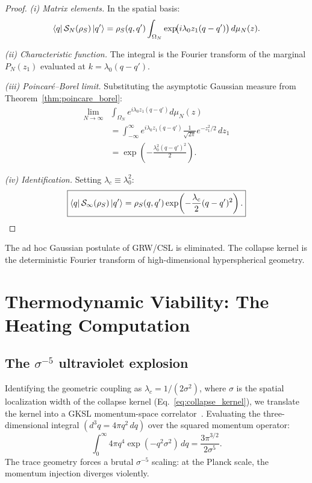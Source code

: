 \documentclass[aps,prd,twocolumn,superscriptaddress,nofootinbib]{revtex4-2}
\theoremstyle{definition}
\theoremstyle{remark}
\newcommand{\SN}{\mathcal{S}_N}
\begin{document}
\begin{proof}
\textit{(i) Matrix elements.} In the spatial basis:
\begin{equation}
\bra{q} \SN(\rho_S) \ket{q'} = \rho_S(q,q')
\int_{\Omega_N} \exp\!\bigl(i\lambda_0 z_1 (q - q')\bigr)\, d\mu_N(z).
\end{equation}

\textit{(ii) Characteristic function.} The integral is the Fourier
transform of the marginal $P_N(z_1)$ evaluated at
$k = \lambda_0(q - q')$.

\textit{(iii) Poincar\'e--Borel limit.} Substituting the asymptotic
Gaussian measure from Theorem~\ref{thm:poincare_borel}:
\begin{align}
\lim_{N \to \infty} &\int_{\Omega_N} e^{i\lambda_0 z_1(q-q')} d\mu_N(z)
\nonumber \\
&= \int_{-\infty}^{\infty} e^{i\lambda_0 z_1(q-q')}
\frac{1}{\sqrt{2\pi}} e^{-z_1^2/2}\, dz_1 \nonumber \\
&= \exp\!\left(-\frac{\lambda_0^2 (q-q')^2}{2}\right).
\label{eq:fourier_gaussian}
\end{align}

\textit{(iv) Identification.} Setting $\lambda_c \equiv \lambda_0^2$:
\begin{equation}
\boxed{
\bra{q} \mathcal{S}_\infty(\rho_S) \ket{q'}
= \rho_S(q,q') \exp\!\left(-\frac{\lambda_c}{2}(q-q')^2\right).
}
\label{eq:collapse_kernel}
\end{equation}
\end{proof}

The ad hoc Gaussian postulate of GRW/CSL is eliminated. The collapse
kernel is the deterministic Fourier transform of high-dimensional
hyperspherical geometry.


\section{Thermodynamic Viability: The Heating Computation}
\label{sec:thermodynamic_viability}

\subsection{The $\sigma^{-5}$ ultraviolet explosion}

Identifying the geometric coupling as $\lambda_c = 1/(2\sigma^2)$, where
$\sigma$ is the spatial localization width of the collapse kernel
(Eq.~\eqref{eq:collapse_kernel}), we translate the kernel into a GKSL
momentum-space correlator~\cite{Lindblad1976,GKS1976}. Evaluating the
three-dimensional integral $(d^3q = 4\pi q^2\, dq)$ over the squared
momentum operator:
\begin{equation}
\int_0^\infty 4\pi q^4 \exp(-q^2 \sigma^2)\, dq
= \frac{3\pi^{3/2}}{2\sigma^5}.
\label{eq:sigma5_integral}
\end{equation}
The trace geometry forces a brutal $\sigma^{-5}$ scaling: at the Planck
scale, the momentum injection diverges violently.
\end{document}
